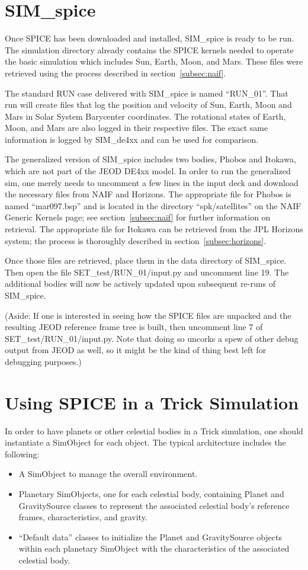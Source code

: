 \section{SIM\_spice}
Once SPICE has been downloaded and installed, SIM\_spice is ready to be run.
The simulation directory already contains the SPICE kernels needed to operate the
basic simulation which includes Sun, Earth, Moon, and Mars.  These files were
retrieved using the process described in section~\ref{subsec:naif}.

The standard RUN case delivered with SIM\_spice is named ``RUN\_01''. That run
will create files that log the position and velocity of Sun, Earth, Moon and
Mars in Solar System Barycenter coordinates. The rotational states of Earth,
Moon, and Mars are also logged in their respective files. The exact same
information is logged by SIM\_de4xx and can be used for comparison. 

The generalized version of SIM\_spice includes two bodies, Phobos and Itokawa,
which are not part of the JEOD DE4xx model. In order to run the generalized sim,
one merely needs to uncomment a few lines in the input deck and download the
necessary files from NAIF and Horizons.  The appropriate file for Phobos is
named ``mar097.bsp'' and is located in the directory ``spk/satellites'' on
the NAIF Generic Kernels page; see section~\ref{subsec:naif} for further
information on retrieval.  The appropriate file for Itokawa can be retrieved
from the JPL Horizons system; the process is thoroughly described in
section~\ref{subsec:horizons}.

Once those files are retrieved, place them in the data directory of
SIM\_spice. Then open the file SET\_test/RUN\_01/input.py and uncomment
line 19. The additional bodies will now be actively updated upon subsequent
re-runs of SIM\_spice.

(Aside: If one is interested in seeing how the SPICE files are unpacked
and the resulting JEOD reference frame tree is built, then uncomment line 7 of
SET\_test/RUN\_01/input.py. Note that doing so uncorks a spew of other debug
output from JEOD as well, so it might be the kind of thing best left for
debugging purposes.)


\section{Using SPICE in a Trick Simulation}\label{sec:builder}
In order to have planets or other celestial bodies in a Trick simulation,
one should instantiate a SimObject for each object. The typical architecture
includes the following:
\begin{itemize}
\item A SimObject to manage the overall environment.
\item Planetary SimObjects, one for each celestial body, containing Planet
and GravitySource classes to represent the associated celestial body's reference
frames, characteristics, and gravity.
\item ``Default data'' classes to initialize the Planet and GravitySource objects
within each planetary SimObject with the characteristics of the associated
celestial body.
\end{itemize}


